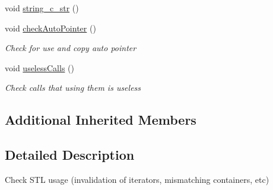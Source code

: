\begin{DoxyCompactItemize}
void \hyperlink{class_check_stl_a9ca51b7cf48aa43cfe9fea0afd704b06}{string\-\_\-c\-\_\-str} ()
\item 
void \hyperlink{class_check_stl_a659a0c88cde0e96a90df8e89b2cb8072}{check\-Auto\-Pointer} ()
\begin{DoxyCompactList}\small\item\em Check for use and copy auto pointer \end{DoxyCompactList}\item 
void \hyperlink{class_check_stl_a0c466bb5dc69db3dedb6f0f3e34e8269}{useless\-Calls} ()
\begin{DoxyCompactList}\small\item\em Check calls that using them is useless \end{DoxyCompactList}\end{DoxyCompactItemize}
\subsection*{Additional Inherited Members}


\subsection{Detailed Description}
Check S\-T\-L usage (invalidation of iterators, mismatching containers, etc) 

